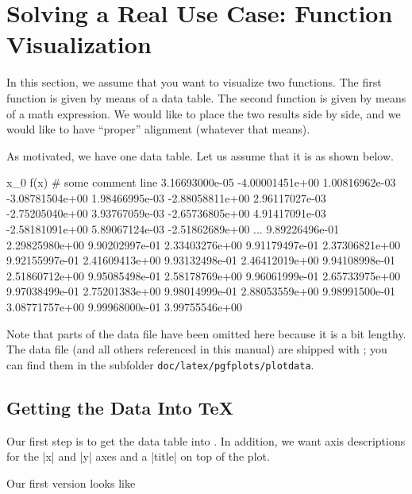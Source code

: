 
\section[tutorial1]{Solving a Real Use Case: Function Visualization}

In this section, we assume that you want to visualize two functions. The first
function is given by means of a data table. The second function is given by
means of a math expression. We would like to place the two results side by
side, and we would like to have ``proper'' alignment (whatever that means).

As motivated, we have one data table. Let us assume that it is as shown below.
%
\begin{codeexample}
x_0	f(x)
# some comment line
3.16693000e-05	-4.00001451e+00
1.00816962e-03	-3.08781504e+00
1.98466995e-03	-2.88058811e+00
2.96117027e-03	-2.75205040e+00
3.93767059e-03	-2.65736805e+00
4.91417091e-03	-2.58181091e+00
5.89067124e-03	-2.51862689e+00
...
9.89226496e-01	2.29825980e+00
9.90202997e-01	2.33403276e+00
9.91179497e-01	2.37306821e+00
9.92155997e-01	2.41609413e+00
9.93132498e-01	2.46412019e+00
9.94108998e-01	2.51860712e+00
9.95085498e-01	2.58178769e+00
9.96061999e-01	2.65733975e+00
9.97038499e-01	2.75201383e+00
9.98014999e-01	2.88053559e+00
9.98991500e-01	3.08771757e+00
9.99968000e-01	3.99755546e+00
\end{codeexample}
%
Note that parts of the data file have been omitted here because it is a bit
lengthy. The data file (and all others referenced in this manual) are shipped
with \PGFPlots{}; you can find them in the subfolder
\texttt{doc/latex/pgfplots/plotdata}.


\subsection{Getting the Data Into \TeX{}}
\label{sec:tut1:step1}

Our first step is to get the data table into \PGFPlots{}. In addition, we want
axis descriptions for the |x| and |y| axes and a |title| on top of the plot.

Our first version looks like
%
\begin{codeexample}[]

%

%
\end{codeexample}

